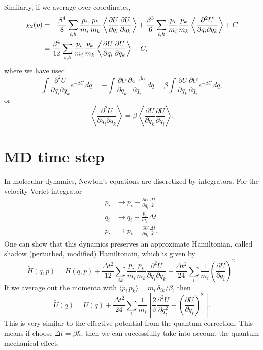 \documentclass{article}
\begin{document}
Similarly,
if we average over coordinates,
\begin{align}
\chi_2(p)
&=
-\frac{ \beta^4 } { 8 }
\sum_{i,k} \frac{p_i}{m_i} \frac{p_k}{m_k}
  \left\langle
    \frac{\partial U}{\partial q_i}
    \frac{\partial U}{\partial q_k}
  \right\rangle
+\frac{ \beta^3 } { 6 }
\sum_{i,k} \frac{p_i}{m_i} \frac{p_k}{m_k}
  \left\langle
    \frac{\partial^2 U}{\partial q_i \partial q_k}
  \right\rangle
+ C
\notag \\
&=
\frac{ \beta^4 } { 12 }
\sum_{i,k} \frac{p_i}{m_i} \frac{p_k}{m_k}
  \left\langle
    \frac{\partial U}{\partial q_i}
    \frac{\partial U}{\partial q_k}
  \right\rangle
+ C,
\end{align}
where we have used
$$
\int
\frac{ \partial^2 U } { \partial q_i \partial q_k} e^{-\beta U} \, dq
=
-\int
\frac{ \partial U } { \partial q_k}
\frac{ \partial e^{-\beta U} } { \partial q_i } \, dq
=
\beta \int
\frac{ \partial U } { \partial q_k}
\frac{ \partial U } { \partial q_i}
e^{-\beta U} \, dq,
$$
or
$$
\left\langle
  \frac{ \partial^2 U } { \partial q_i \partial q_k}
\right\rangle
=
\beta \,
\left\langle
  \frac{ \partial U } { \partial q_k}
  \frac{ \partial U } { \partial q_i}
\right\rangle.
$$


\section{MD time step}


In molecular dynamics, Newton's equations are discretized
by integrators.
For the velocity Verlet integrator
$$
\begin{aligned}
p_i &\rightarrow  p_i - \frac{ \partial U } { \partial q_i } \frac{\Delta t}{2} \\
q_i &\rightarrow  q_i + \frac{ p_i } { m_i } \Delta t \\
p_i &\rightarrow  p_i - \frac{ \partial U } { \partial q_i } \frac{\Delta t}{2},
\end{aligned}
$$
One can show that this dynamics preserves an approximate Hamiltonian,
called shadow (perturbed, modified) Hamiltonain,
which is given by
$$
\tilde H(q, p)
=
H(q, p)
+
\frac{ \Delta t^2 }{12}
\sum_{ik} \frac{p_i}{m_i}
    \frac{p_k}{m_k}
    \frac{ \partial^2 U } { \partial q_i \partial q_k }
-
\frac{ \Delta t^2 } { 24 }
\sum_i \frac{1}{m_i}
    \left( \frac{ \partial U } { \partial q_i } \right)^2.
$$
If we average out the momenta
with $\langle p_i \, p_k \rangle = m_i \, \delta_{ik} / \beta$,
then
$$
\tilde U(q)
=
U(q)
+
\frac{ \Delta t^2 }{ 24 }
\sum_{i}
  \frac{1}{m_i}
  \left[
  \frac{2}{\beta}
    \frac{ \partial^2 U } { \partial q_i^2 }
-
    \left( \frac{ \partial U } { \partial q_i } \right)^2
\right].
$$
This is very similar to the effective potential from the quantum correction.
%
This means if choose $\Delta t = \beta \hbar$,
then we can successfully take into account the quantum mechanical effect.
\end{document}
